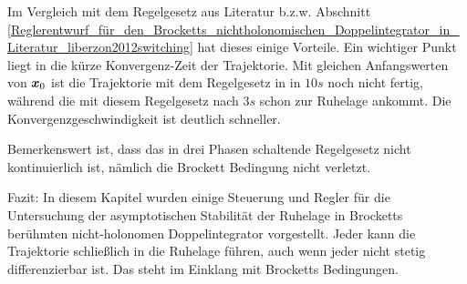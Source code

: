 Im Vergleich mit dem Regelgesetz aus Literatur \cite{liberzon2012switching} b.z.w. Abschnitt \ref{Reglerentwurf_für_den_Brocketts_nichtholonomischen_Doppelintegrator_in_Literatur_liberzon2012switching} hat dieses einige Vorteile. Ein wichtiger Punkt liegt in die kürze Konvergenz-Zeit der Trajektorie. Mit gleichen Anfangswerten von $\boldsymbol x_{0}$ ist die Trajektorie mit dem Regelgesetz in \cite{liberzon2012switching} in $10s$ noch nicht fertig, während die mit diesem Regelgesetz nach $3s$ schon zur Ruhelage ankommt. Die Konvergenzgeschwindigkeit ist deutlich schneller.

Bemerkenswert ist, dass das in drei Phasen schaltende Regelgesetz nicht kontinuierlich ist, nämlich die Brockett Bedingung nicht verletzt. 

Fazit: In diesem Kapitel wurden einige Steuerung und Regler für die Untersuchung der asymptotischen Stabilität der Ruhelage in Brocketts berühmten nicht-holonomen Doppelintegrator vorgestellt. Jeder kann die Trajektorie schließlich in die Ruhelage führen, auch wenn jeder nicht stetig differenzierbar ist. Das steht im Einklang mit Brocketts Bedingungen.
